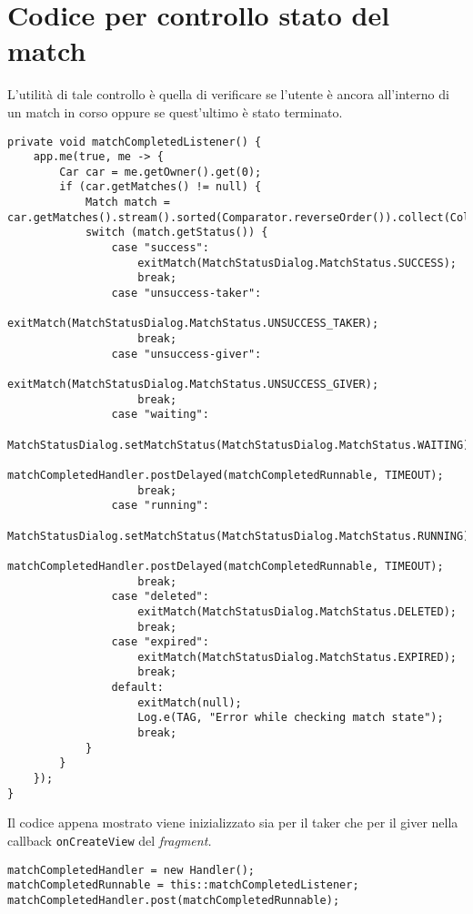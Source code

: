\hypertarget{codice-per-controllo-stato-del-match}{%
\section{Codice per controllo stato del
match}\label{codice-per-controllo-stato-del-match}}

L'utilità di tale controllo è quella di verificare se l'utente è ancora
all'interno di un match in corso oppure se quest'ultimo è stato
terminato.

\begin{lstlisting}[caption=Controllo per verificare se un match è completato]
private void matchCompletedListener() {
    app.me(true, me -> {
        Car car = me.getOwner().get(0);
        if (car.getMatches() != null) {
            Match match = car.getMatches().stream().sorted(Comparator.reverseOrder()).collect(Collectors.toList()).get(0);
            switch (match.getStatus()) {
                case "success":
                    exitMatch(MatchStatusDialog.MatchStatus.SUCCESS);
                    break;
                case "unsuccess-taker":
                    exitMatch(MatchStatusDialog.MatchStatus.UNSUCCESS_TAKER);
                    break;
                case "unsuccess-giver":
                    exitMatch(MatchStatusDialog.MatchStatus.UNSUCCESS_GIVER);
                    break;
                case "waiting":
                    MatchStatusDialog.setMatchStatus(MatchStatusDialog.MatchStatus.WAITING);
                    matchCompletedHandler.postDelayed(matchCompletedRunnable, TIMEOUT);
                    break;
                case "running":
                    MatchStatusDialog.setMatchStatus(MatchStatusDialog.MatchStatus.RUNNING);
                    matchCompletedHandler.postDelayed(matchCompletedRunnable, TIMEOUT);
                    break;
                case "deleted":
                    exitMatch(MatchStatusDialog.MatchStatus.DELETED);
                    break;
                case "expired":
                    exitMatch(MatchStatusDialog.MatchStatus.EXPIRED);
                    break;
                default:
                    exitMatch(null);
                    Log.e(TAG, "Error while checking match state");
                    break;
            }
        }
    });
}
\end{lstlisting}


Il codice appena mostrato viene inizializzato sia per il taker che per
il giver nella callback \texttt{onCreateView} del \emph{fragment.}

\begin{lstlisting}[caption=Inizializzazione dell'handler e del runnable]
matchCompletedHandler = new Handler();
matchCompletedRunnable = this::matchCompletedListener;
matchCompletedHandler.post(matchCompletedRunnable);
\end{lstlisting}


